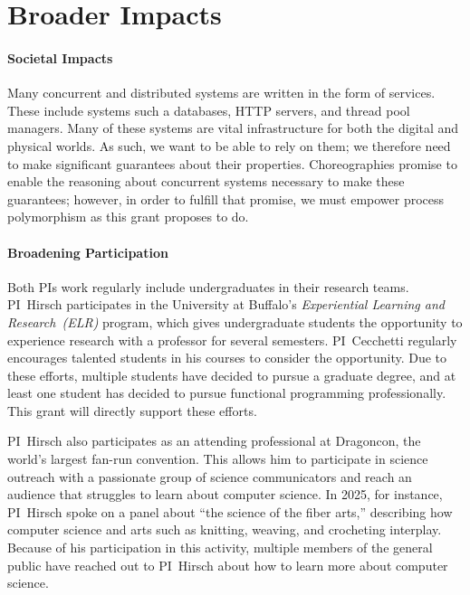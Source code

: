 \section{Broader Impacts}
\label{sec:broader}

\paragraph{Societal Impacts}
Many concurrent and distributed systems are written in the form of services.
These include systems such a databases, HTTP servers, and thread pool managers.
Many of these systems are vital infrastructure for both the digital and physical worlds.
As such, we want to be able to rely on them; we therefore need to make significant guarantees about their properties.
Choreographies promise to enable the reasoning about concurrent systems necessary to make these guarantees; however, in order to fulfill that promise, we must empower process polymorphism as this grant proposes to do.

\paragraph{Broadening Participation}
Both PIs work regularly include undergraduates in their research teams.
PI~Hirsch participates in the University at Buffalo's \emph{Experiential Learning and Research~(ELR)} program, which gives undergraduate students the opportunity to experience research with a professor for several semesters.
PI~Cecchetti regularly encourages talented students in his courses to consider the opportunity.
Due to these efforts, multiple students have decided to pursue a graduate degree, and at least one student has decided to pursue functional programming professionally.
This grant will directly support these efforts.

PI~Hirsch also participates as an attending professional at Dragoncon, the world's largest fan-run convention.
This allows him to participate in science outreach with a passionate group of science communicators and reach an audience that struggles to learn about computer science.
In 2025, for instance, PI~Hirsch spoke on a panel about ``the science of the fiber arts,'' describing how computer science and arts such as knitting, weaving, and crocheting interplay.
Because of his participation in this activity, multiple members of the general public have reached out to PI~Hirsch about how to learn more about computer science.

